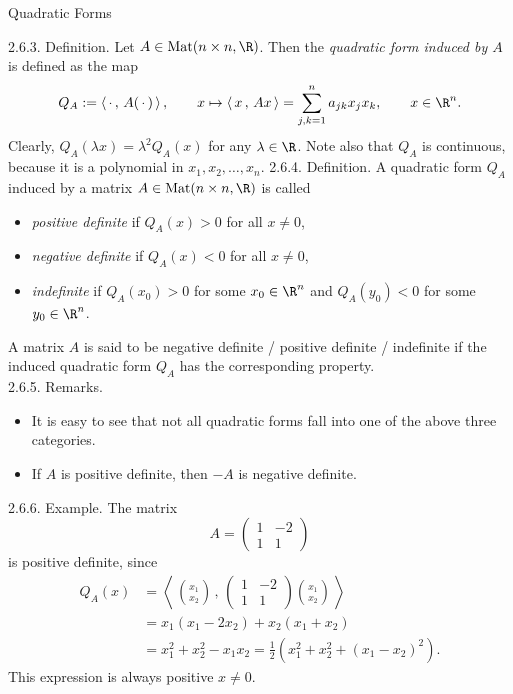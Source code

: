 \documentclass[smaller,hyperref={CJKbookmarks=true}]{beamer}
\newcommand{\myseries}[2]{$#1_1,#1_2,\dots,#1_#2$}
\newcommand{\scp}[2]{\left\langle\,#1\,,\,#2\,\right\rangle} \newcommand{\scpp}{\langle\,\cdot\,,\,\cdot\,\rangle}
\begin{document}
\begin{frame}{Quadratic Forms}
\begin{spacing}{1.05}
\vspace*{22pt}
\alert{2.6.3. Definition.} Let $A\in\text{Mat}(n\times n,\R)$. Then the \emph{quadratic form induced by $A$} is defined as the map
\[Q_A:=\scp{\cdot}{A(\,\cdot\,)},\qquad
x\mapsto\scp{x}{Ax}=\sum_{j,k=1}^{n}a_{jk}x_jx_k,
\qquad x\in\R^n.\]
Clearly, $Q_A(\lambda x)=\lambda^2Q_A(x)$ for any $\lambda\in\R$. Note also that $Q_A$ is continuous, because it is a polynomial in \myseries{x}{n}.
\newpage
\alert{2.6.4. Definition.} A quadratic form $Q_A$ induced by a matrix $A\in\text{Mat}(n\times n,\R)$ is called
\begin{itemize}
  \item \emph{positive definite} if $Q_A(x)>0$ for all $x\neq0$,
  \item \emph{negative definite} if $Q_A(x)<0$ for all $x\neq0$,
  \item \emph{indefinite} if $Q_A(x_0)>0$ for some $x_0\in\R^n$ and $Q_A(y_0)<0$ for some $y_0\in\R^n$.
\end{itemize}
A matrix $A$ is said to be negative definite / positive definite / indefinite if the induced quadratic form $Q_A$ has the corresponding property.\\[7pt]
\alert{2.6.5. Remarks.}
\begin{itemize}
  \item It is easy to see that not all quadratic forms fall into one of the above
three categories.
  \item If $A$ is positive definite, then $-A$ is negative definite.
\end{itemize}
\newpage
\alert{2.6.6. Example.} The matrix
\[A=\begin{pmatrix}
      1 & -2 \\
      1 & 1
    \end{pmatrix}\]
is positive definite, since
\begin{equation*}
  \begin{split}
     Q_A(x) &=\scp{\binom{x_1}{x_2}}{\begin{pmatrix}
                                1 & -2 \\
                                1 & 1
                              \end{pmatrix}\binom{x_1}{x_2}} \\
       &=x_1(x_1-2x_2)+x_2(x_1+x_2) \\
       &=x_1^2+x_2^2-x_1x_2=\frac{1}{2}\left(x_1^2+x_2^2+(x_1-x_2)^2\right).
  \end{split}
\end{equation*}
This expression is always positive $x\neq0$.
\end{spacing}
\end{frame}
\end{document}
